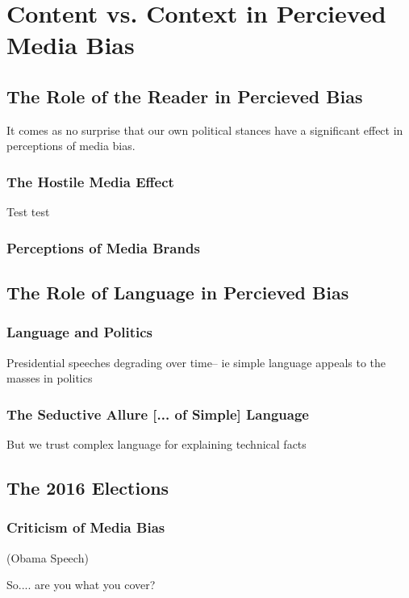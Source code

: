 \chapter{Content vs. Context in Percieved Media Bias}

\section{The Role of the Reader in Percieved Bias}

It comes as no surprise that our own political stances have a significant effect in perceptions of media bias.

\subsection{The Hostile Media Effect}
Test test
\cite{vallone1985hostile}
\subsection{Perceptions of Media Brands}


\section{The Role of Language in Percieved Bias} 
\subsection{Language and Politics}
Presidential speeches degrading over time-- ie simple language appeals to the masses in politics
\subsection{The Seductive Allure [... of Simple] Language}
But we trust complex language for explaining technical facts


\section{The 2016 Elections} 
\subsection{Criticism of Media Bias} 
(Obama Speech)

So.... are you what you cover?








